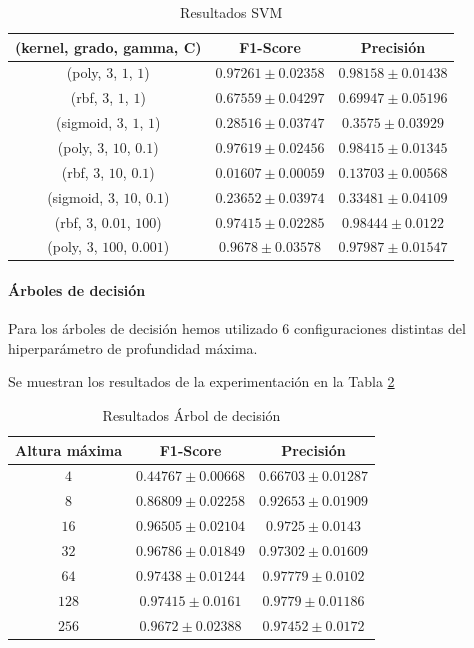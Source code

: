 \documentclass[12pt]{article}
\begin{document}
\begin{table}[!ht]
	\caption{Resultados SVM}
	\centering
		 \begin{tabular}{||c c c||}
			 \hline
			 (kernel, grado, gamma, C) & F1-Score & Precisión  \\ [0.5ex]
			 \hline\hline
			 (poly, $3$, $1$, $1$) & $0.97261 \pm 0.02358$ & $0.98158 \pm 0.01438$ \\
			 \hline
			 (rbf, $3$, $1$, $1$) & $0.67559 \pm 0.04297$ & $0.69947 \pm 0.05196$ \\
			 \hline
			 (sigmoid, $3$, $1$, $1$) & $0.28516 \pm 0.03747$ & $0.3575 \pm 0.03929$ \\
			 \hline
			 (poly, $3$, $10$, $0.1$) & $0.97619 \pm 0.02456$ & $0.98415 \pm 0.01345$ \\
			 \hline
			 (rbf, $3$, $10$, $0.1$) & $0.01607 \pm 0.00059$ & $0.13703 \pm 0.00568$ \\
			 \hline
			 (sigmoid, $3$, $10$, $0.1$) & $0.23652 \pm 0.03974$ & $0.33481 \pm 0.04109$ \\
			 \hline
			 (rbf, $3$, $0.01$, $100$) & $0.97415 \pm 0.02285$ & $0.98444 \pm 0.0122$ \\
			 \hline
			 (poly, $3$, $100$, $0.001$) & $0.9678 \pm 0.03578$ & $0.97987 \pm 0.01547$ \\
			 \hline
		 \end{tabular}
	\label{Tab:SVM_2}
	\end{table}

\paragraph{Árboles de decisión}
Para los árboles de decisión hemos utilizado 6 configuraciones distintas del hiperparámetro de profundidad máxima.

Se muestran los resultados de la experimentación en la Tabla \ref{Tab:DecisionTree_2}

\begin{table}[!ht]
	\caption{Resultados Árbol de decisión}
	\centering
		 \begin{tabular}{||c c c||}
			 \hline
			 Altura máxima & F1-Score & Precisión  \\ [0.5ex]
			 \hline\hline
			 $4$ & $0.44767 \pm 0.00668$ & $0.66703 \pm 0.01287$ \\
			 \hline
			 $8$ & $0.86809 \pm 0.02258$ & $0.92653 \pm 0.01909$ \\
			 \hline
			 $16$ & $0.96505 \pm 0.02104$ & $0.9725 \pm 0.0143$ \\
			 \hline
			 $32$ & $0.96786 \pm 0.01849$ & $0.97302 \pm 0.01609$ \\
			 \hline
			 $64$ & $0.97438 \pm 0.01244$ & $0.97779 \pm 0.0102$ \\
			 \hline
			 $128$ & $0.97415 \pm 0.0161$ & $0.9779 \pm 0.01186$ \\
			 \hline
			 $256$ & $0.9672 \pm 0.02388$ & $0.97452 \pm 0.0172$ \\
			 \hline
		 \end{tabular}
	\label{Tab:DecisionTree_2}
	\end{table}
\end{document}
